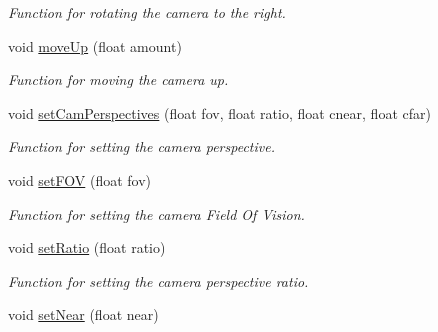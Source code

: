 \begin{DoxyCompactItemize}
\begin{DoxyCompactList}\small\item\em Function for rotating the camera to the right. \end{DoxyCompactList}\item 
\hypertarget{class_camera_a941378afae5e99c766f8bfd508c42008}{void \hyperlink{class_camera_a941378afae5e99c766f8bfd508c42008}{move\-Up} (float amount)}\label{class_camera_a941378afae5e99c766f8bfd508c42008}

\begin{DoxyCompactList}\small\item\em Function for moving the camera up. \end{DoxyCompactList}\item 
\hypertarget{class_camera_a5b65e0419860419673a4d00b430f599e}{void \hyperlink{class_camera_a5b65e0419860419673a4d00b430f599e}{set\-Cam\-Perspectives} (float fov, float ratio, float cnear, float cfar)}\label{class_camera_a5b65e0419860419673a4d00b430f599e}

\begin{DoxyCompactList}\small\item\em Function for setting the camera perspective. \end{DoxyCompactList}\item 
\hypertarget{class_camera_ade53ee61895c2143da3cec03d08ef3eb}{void \hyperlink{class_camera_ade53ee61895c2143da3cec03d08ef3eb}{set\-F\-O\-V} (float fov)}\label{class_camera_ade53ee61895c2143da3cec03d08ef3eb}

\begin{DoxyCompactList}\small\item\em Function for setting the camera Field Of Vision. \end{DoxyCompactList}\item 
\hypertarget{class_camera_a2ddcff55d196d1c57a3310d9c6119f95}{void \hyperlink{class_camera_a2ddcff55d196d1c57a3310d9c6119f95}{set\-Ratio} (float ratio)}\label{class_camera_a2ddcff55d196d1c57a3310d9c6119f95}

\begin{DoxyCompactList}\small\item\em Function for setting the camera perspective ratio. \end{DoxyCompactList}\item 
\hypertarget{class_camera_a72d9ada917618e3505fa0cd1f82f6272}{void \hyperlink{class_camera_a72d9ada917618e3505fa0cd1f82f6272}{set\-Near} (float near)}\label{class_camera_a72d9ada917618e3505fa0cd1f82f6272}


\end{DoxyCompactItemize}

